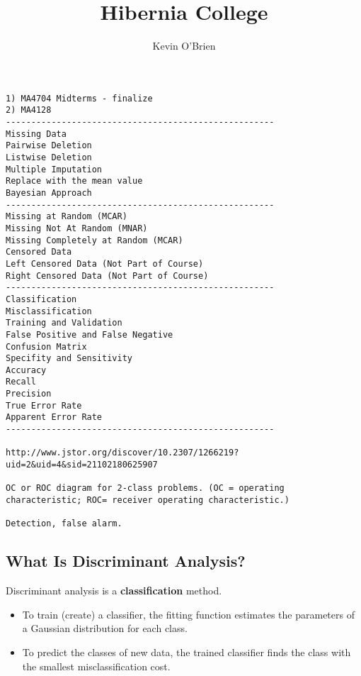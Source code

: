 \documentclass[12pt]{article} %
\title{Hibernia College}
\author{Kevin O'Brien}
\begin{document}
\maketitle
\begin{verbatim}
1) MA4704 Midterms - finalize
2) MA4128
-----------------------------------------------------
Missing Data
Pairwise Deletion
Listwise Deletion
Multiple Imputation
Replace with the mean value
Bayesian Approach 
-----------------------------------------------------
Missing at Random (MCAR)
Missing Not At Random (MNAR)
Missing Completely at Random (MCAR)
Censored Data
Left Censored Data (Not Part of Course)
Right Censored Data (Not Part of Course)
-----------------------------------------------------
Classification
Misclassification
Training and Validation
False Positive and False Negative
Confusion Matrix
Specifity and Sensitivity
Accuracy
Recall
Precision
True Error Rate
Apparent Error Rate
-----------------------------------------------------

http://www.jstor.org/discover/10.2307/1266219?uid=2&uid=4&sid=21102180625907

OC or ROC diagram for 2-class problems. (OC = operating characteristic; ROC= receiver operating characteristic.)

Detection, false alarm.

\end{verbatim}

\newpage












\subsection{What Is Discriminant Analysis?}

Discriminant analysis is a \textbf{classification} method. 


\begin{itemize}
\item To train (create) a classifier, the fitting function estimates the parameters of a Gaussian distribution for each class.
\item To predict the classes of new data, the trained classifier finds the class with the smallest misclassification cost.
\end{itemize}
\end{document}
